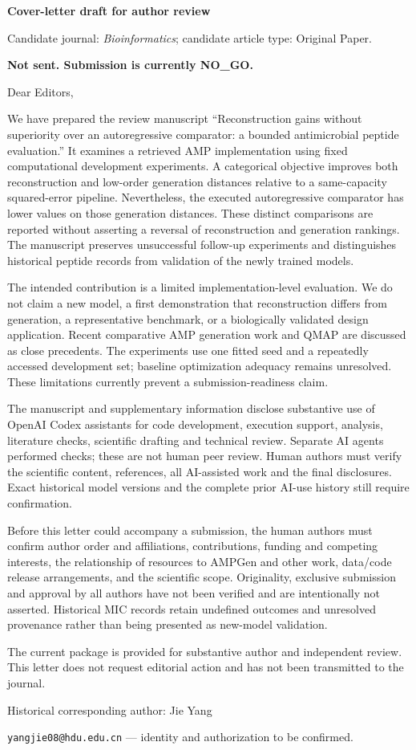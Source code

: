 \documentclass[12pt,a4paper]{article}
\begin{document}
\noindent\textbf{Cover-letter draft for author review}\par
\noindent Candidate journal: \textit{Bioinformatics}; candidate article type: Original Paper.\par
\noindent\textbf{Not sent. Submission is currently NO\_GO.}
\bigskip

\noindent Dear Editors,

We have prepared the review manuscript ``Reconstruction gains without superiority over an autoregressive comparator: a bounded antimicrobial peptide evaluation.'' It examines a retrieved AMP implementation using fixed computational development experiments. A categorical objective improves both reconstruction and low-order generation distances relative to a same-capacity squared-error pipeline. Nevertheless, the executed autoregressive comparator has lower values on those generation distances. These distinct comparisons are reported without asserting a reversal of reconstruction and generation rankings. The manuscript preserves unsuccessful follow-up experiments and distinguishes historical peptide records from validation of the newly trained models.

The intended contribution is a limited implementation-level evaluation. We do not claim a new model, a first demonstration that reconstruction differs from generation, a representative benchmark, or a biologically validated design application. Recent comparative AMP generation work and QMAP are discussed as close precedents. The experiments use one fitted seed and a repeatedly accessed development set; baseline optimization adequacy remains unresolved. These limitations currently prevent a submission-readiness claim.

The manuscript and supplementary information disclose substantive use of OpenAI Codex assistants for code development, execution support, analysis, literature checks, scientific drafting and technical review. Separate AI agents performed checks; these are not human peer review. Human authors must verify the scientific content, references, all AI-assisted work and the final disclosures. Exact historical model versions and the complete prior AI-use history still require confirmation.

Before this letter could accompany a submission, the human authors must confirm author order and affiliations, contributions, funding and competing interests, the relationship of resources to AMPGen and other work, data/code release arrangements, and the scientific scope. Originality, exclusive submission and approval by all authors have not been verified and are intentionally not asserted. Historical MIC records retain undefined outcomes and unresolved provenance rather than being presented as new-model validation.

The current package is provided for substantive author and independent review. This letter does not request editorial action and has not been transmitted to the journal.

\bigskip\noindent Historical corresponding author: Jie Yang\par
\noindent \texttt{yangjie08@hdu.edu.cn} --- identity and authorization to be confirmed.
\end{document}
